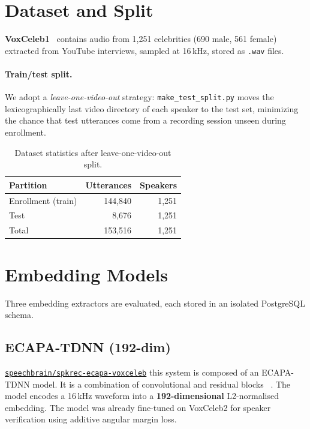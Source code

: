 \documentclass[12pt, a4paper]{article}
\newcommand{\code}[1]{\texttt{#1}}
\begin{document}
\section{Dataset and Split}
\label{sec:dataset}

\textbf{VoxCeleb1}~\cite{nagrani2017voxceleb} contains audio from
1,251 celebrities (690 male, 561 female) extracted from YouTube
interviews, sampled at 16\,kHz, stored as \code{.wav} files.

\paragraph{Train/test split.}
We adopt a \emph{leave-one-video-out} strategy:
\code{make\_test\_split.py} moves the lexicographically last video
directory of each speaker to the test set, minimizing the chance that test utterances come from a recording session unseen during enrollment.

\begin{table}[H]
\centering
\caption{Dataset statistics after leave-one-video-out split.}
\label{tab:dataset}
\begin{tabular}{lrr}
\toprule
\textbf{Partition} & \textbf{Utterances} & \textbf{Speakers} \\
\midrule
Enrollment (train) & 144,840 & 1,251 \\
Test               &   8,676 & 1,251 \\
\midrule
Total              & 153,516 & 1,251 \\
\bottomrule
\end{tabular}
\end{table}


\section{Embedding Models}
\label{sec:embedding}

Three embedding extractors are evaluated, each stored in an isolated
PostgreSQL schema.

\subsection{ECAPA-TDNN (192-dim)}

\href{https://huggingface.co/speechbrain/spkrec-ecapa-voxceleb}%
{\code{speechbrain/spkrec-ecapa-voxceleb}} this system is composed of an ECAPA-TDNN model. It is a combination of convolutional and residual blocks ~\cite{desplanques2020ecapa,ravanelli2021speechbrain}. The model encodes a 16\,kHz waveform into a \textbf{192-dimensional}
L2-normalised embedding.
The model was already fine-tuned on VoxCeleb2 for speaker verification using
additive angular margin loss.
\end{document}
